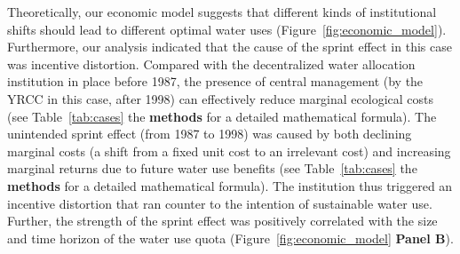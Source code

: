 Theoretically, our economic model suggests that different kinds of institutional shifts should lead to different optimal water uses (Figure~\ref{fig:economic_model}).
Furthermore, our analysis indicated that the cause of the sprint effect in this case was incentive distortion.
Compared with the decentralized water allocation institution in place before 1987, the presence of central management (by the YRCC in this case, after 1998) can effectively reduce marginal ecological costs (see Table~\ref{tab:cases} the \textbf{methods} for a detailed mathematical formula).
The unintended sprint effect (from 1987 to 1998) was caused by both declining marginal costs (a shift from a fixed unit cost to an irrelevant cost) and increasing marginal returns due to future water use benefits (see Table~\ref{tab:cases} the \textbf{methods} for a detailed mathematical formula).
The institution thus triggered an incentive distortion that ran counter to the intention of sustainable water use. Further, the strength of the sprint effect was positively correlated with the size and time horizon of the water use quota (Figure~\ref{fig:economic_model} \textbf{Panel B}).


